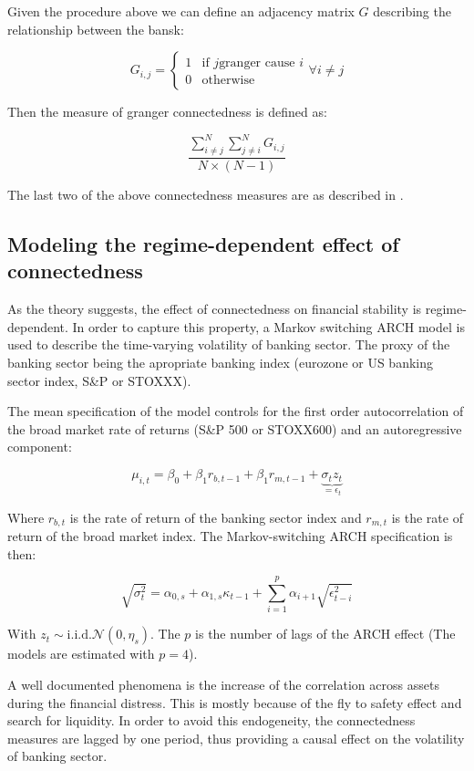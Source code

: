 \documentclass{article}
\begin{document}
Given the procedure above we can define an adjacency matrix $G$ describing the relationship between the bansk:

\[G_{i,j} = \begin{cases}
    1  & \text{if } j \text{granger cause } i \\
    0 & \text{otherwise}
  \end{cases} \forall i \neq j\]

Then the measure of granger connectedness is defined as:

\[\frac{\sum_{i \neq j}^{N} \sum_{j \neq i}^{N} G_{i,j}}{ N \times (N-1)}\]

The last two of the above connectedness measures are as described in \citet{billio}.


\subsection*{Modeling the regime-dependent effect of connectedness}

As the theory suggests, the effect of connectedness on financial stability is regime-dependent. In order to capture this property, a Markov switching ARCH model is used to describe the time-varying volatility of banking sector. The proxy of the banking sector being the apropriate banking index (eurozone or US banking sector index, S\&P or STOXXX).

The mean specification of the model controls for the first order autocorrelation of the broad market rate of returns (S\&P 500 or STOXX600) and an autoregressive component:

\[\mu_{i,t} = \beta_0 + \beta_1 r_{b,t-1} + \beta_1 r_{m,t-1} + \underbrace{\sigma_t z_t}_{=\epsilon_t}\]

Where $r_{b,t}$ is the rate of return of the banking sector index and $r_{m,t}$ is the rate of return of the broad market index. The Markov-switching ARCH specification is then:

\[\sqrt{\sigma^2_t} = \alpha_{0,s} + \alpha_{1,s} \kappa_{t-1} + \sum_{i=1}^{p} \alpha_{i+1} \sqrt{\epsilon^2_{t-i}}\]

With $z_t \sim \text{i.i.d.} \mathcal{N}(0, \eta_s)$. The $p$ is the number of lags of the ARCH effect (The models are estimated with $p = 4$).

A well documented phenomena is the increase of the correlation across assets during the financial distress. This is mostly because of the fly to safety effect and search for liquidity. In order to avoid this endogeneity, the connectedness measures are lagged by one period, thus providing a causal effect on the volatility of banking sector.
\end{document}
